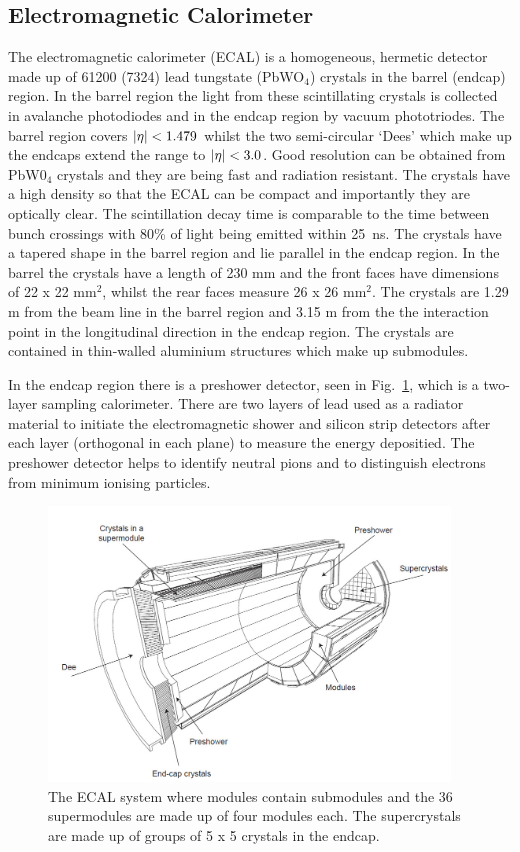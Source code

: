 \subsection{Electromagnetic Calorimeter}

The electromagnetic calorimeter (ECAL) is a homogeneous, hermetic detector made up of 61200 (7324) lead tungstate (PbWO$_{4}$) crystals in the barrel (endcap) region. In the barrel region the light from these scintillating crystals is collected in avalanche photodiodes and in the endcap region by vacuum phototriodes. The barrel region covers $\lvert \eta \rvert<1.479$ whilst the two semi-circular `Dees' which make up the endcaps extend the range to $\lvert \eta \rvert<3.0$. Good resolution can be obtained from PbW0$_{4}$ crystals and they are being fast and radiation resistant. The crystals have a high density so that the ECAL can be compact and importantly they are optically clear. The scintillation decay time is comparable to the time between bunch crossings with 80\% of light being emitted within 25~ns. The crystals have a tapered shape in the barrel region and lie parallel in the endcap region. In the barrel the crystals have a length of 230 mm and the front faces have dimensions of 22 x 22 mm$^{2}$, whilst the rear faces measure 26 x 26 mm$^{2}$. The crystals are 1.29 m from the beam line in the barrel region and 3.15 m from the the interaction point in the longitudinal direction in the endcap region. The crystals are contained in thin-walled aluminium structures which make up submodules.

In the endcap region there is a preshower detector, seen in Fig.~\ref{fig:ecal}, which is a two-layer sampling calorimeter. There are two layers of lead used as a radiator material to initiate the electromagnetic shower and silicon strip detectors after each layer (orthogonal in each plane) to measure the energy depositied. The preshower detector helps to identify neutral pions and to distinguish electrons from minimum ionising particles.

\begin{figure}[ht!]
\centering
    \includegraphics[width=0.95\textwidth]{images/ecal.png}
    \caption{The ECAL system where modules contain submodules and the 36 supermodules are made up of four modules each. The supercrystals are made up of groups of 5 x 5 crystals in the endcap.}
    \label{fig:ecal}
\end{figure}

